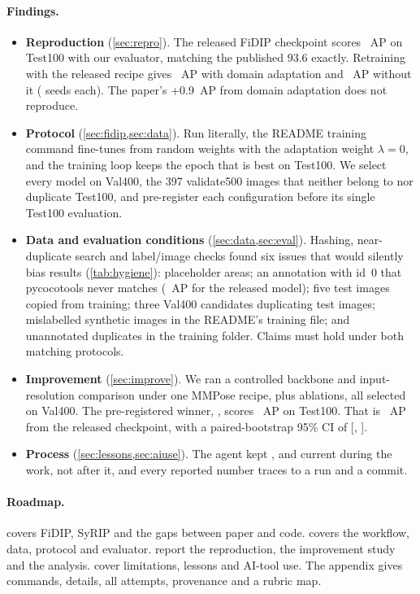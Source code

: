 \paragraph{Findings.}
\begin{itemize}[leftmargin=*]
  \item \textbf{Reproduction} (\cref{sec:repro}). The released FiDIP checkpoint scores ~AP on Test100 with our evaluator, matching the published 93.6 exactly.
  Retraining with the released recipe gives ~AP with domain adaptation and ~AP without it ( seeds each). The paper's +0.9~AP from domain adaptation does not reproduce.
  \item \textbf{Protocol} (\cref{sec:fidip,sec:data}). Run literally, the README training command fine-tunes from random weights with the adaptation weight $\lambda=0$, and the training loop keeps the epoch that is best on Test100.
  We select every model on Val400, the 397 validate500 images that neither belong to nor duplicate Test100, and pre-register each configuration before its single Test100 evaluation.
  \item \textbf{Data and evaluation conditions} (\cref{sec:data,sec:eval}). Hashing, near-duplicate search and label/image checks found six issues that would silently bias results (\cref{tab:hygiene}): placeholder areas; an annotation with id~0 that pycocotools never matches (~AP for the released model); five test images copied from training; three Val400 candidates duplicating test images; mislabelled synthetic images in the README's training file; and unannotated duplicates in the training folder. Claims must hold under both matching protocols.
  \item \textbf{Improvement} (\cref{sec:improve}). We ran a controlled backbone and input-resolution comparison under one MMPose recipe, plus ablations, all selected on Val400.
  The pre-registered winner, , scores ~AP on Test100. That is ~AP from the released checkpoint, with a paired-bootstrap 95\% CI of [, ].
  \item \textbf{Process} (\cref{sec:lessons,sec:aiuse}). The agent kept ,  and  current during the work, not after it, and every reported number traces to a run and a commit.
\end{itemize}

\paragraph{Roadmap.}  covers FiDIP, SyRIP and the gaps between paper and code.  covers the workflow, data, protocol and evaluator.  report the reproduction, the improvement study and the analysis.  cover limitations, lessons and AI-tool use. The appendix gives commands, details, all attempts, provenance and a rubric map.
